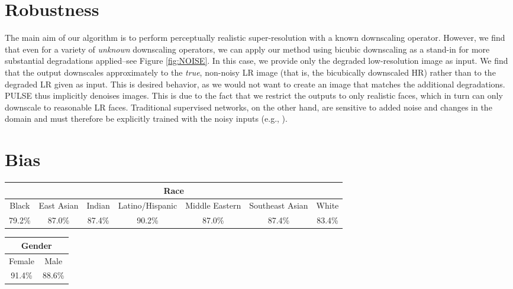 \documentclass[10pt,twocolumn,letterpaper]{article}
\begin{document}
\section{Robustness}
The main aim of our algorithm is to perform perceptually realistic super-resolution with a known downscaling operator. However, we find that even for a variety of \textit{unknown} downscaling operators, we can apply our method using bicubic downscaling as a stand-in for more substantial degradations applied--see Figure \ref{fig:NOISE}. In this case, we provide only the degraded low-resolution image as input. We find that the output downscales approximately to the \textit{true}, non-noisy LR image (that is, the bicubically downscaled HR) rather than to the degraded LR given as input. This is desired behavior, as we would not want to create an image that matches the additional degradations. PULSE thus implicitly denoises images. This is due to the fact that we restrict the outputs to only realistic faces, which in turn can only downscale to reasonable LR faces. Traditional supervised networks, on the other hand, are sensitive to added noise and changes in the domain and must therefore be explicitly trained with the noisy inputs (e.g., \cite{DNSR}). 

\section{Bias} \label{bias}

\begin{table*}[ht]
\centering
\begin{tabular}{|c|c|c|c|c|c|c|}
    \hline
    \multicolumn{7}{|c|}{Race}                                                                 \\ \hline
    Black  & East Asian & Indian & Latino/Hispanic & Middle Eastern & Southeast Asian & White  \\ \hline
    79.2\% & 87.0\%     & 87.4\% & 90.2\%          & 87.0\%         & 87.4\%          & 83.4\% \\ \hline
\end{tabular}
\begin{tabular}{|c|c|}
    \hline
    \multicolumn{2}{|c|}{Gender} \\ \hline
    Female        & Male         \\ \hline
    91.4\%        & 88.6\%       \\ \hline
\end{tabular}
\label{tab:bias}\newline
\caption{Success rates (frequency with which PULSE finds an image in the outputs of the generator that downscales correctly) of PULSE with StyleGAN-FFHQ across various groups, evaluated on FairFace. See ``Failure to converge'' in Section \ref{bias} for full explanation of this analysis and its limitations.}
\end{table*}
\end{document}
